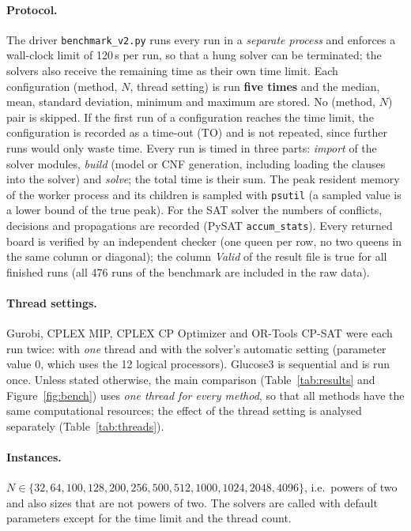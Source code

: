 \documentclass[a4paper,fleqn]{cas-sc}
\begin{document}
\paragraph{Protocol.}
The driver \texttt{benchmark\_v2.py} runs every run in a \emph{separate process} and enforces a wall-clock limit of 120\,s per run, so that a hung solver can be terminated; the solvers also receive the remaining time as their own time limit.
Each configuration (method, $N$, thread setting) is run \textbf{five times} and the median, mean, standard deviation, minimum and maximum are stored.
No (method, $N$) pair is skipped.
If the first run of a configuration reaches the time limit, the configuration is recorded as a time-out (\textsc{TO}) and is not repeated, since further runs would only waste time.
Every run is timed in three parts: \emph{import} of the solver modules, \emph{build} (model or CNF generation, including loading the clauses into the solver) and \emph{solve}; the total time is their sum.
The peak resident memory of the worker process and its children is sampled with \texttt{psutil} (a sampled value is a lower bound of the true peak).
For the SAT solver the numbers of conflicts, decisions and propagations are recorded (PySAT \texttt{accum\_stats}).
Every returned board is verified by an independent checker (one queen per row, no two queens in the same column or diagonal); the column \emph{Valid} of the result file is true for all finished runs (all 476 runs of the benchmark are included in the raw data).

\paragraph{Thread settings.}
Gurobi, CPLEX MIP, CPLEX CP Optimizer and OR-Tools CP-SAT were each run twice: with \emph{one} thread and with the solver's automatic setting (parameter value 0, which uses the 12 logical processors).
Glucose3 is sequential and is run once.
Unless stated otherwise, the main comparison (Table~\ref{tab:results} and Figure~\ref{fig:bench}) uses \emph{one thread for every method}, so that all methods have the same computational resources; the effect of the thread setting is analysed separately (Table~\ref{tab:threads}).

\paragraph{Instances.}
$N\in\{32,64,100,128,200,256,500,512,1000,1024,2048,4096\}$, i.e.\ powers of two and also sizes that are not powers of two.
The solvers are called with default parameters except for the time limit and the thread count.
\end{document}
